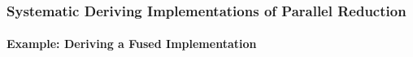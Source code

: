 \subsubsection{Systematic Deriving Implementations of Parallel Reduction}

\paragraph{Example: Deriving a Fused Implementation}

\newcommand{\Reduce}{\text{\textit{reduce}}\xspace}
\newcommand{\PartRed}{\text{\textit{part-red}}\xspace}
\newcommand{\RedSeq}{\text{\textit{reduce-seq}}\xspace}
\newcommand{\Map}{\text{\textit{map}}\xspace}
\newcommand{\MapSeq}{\text{\textit{map-seq}}\xspace}
\newcommand{\MyJoin}{\text{\textit{join}}\xspace}
\newcommand{\MySplit}[1]{\text{\textit{split}}^{#1}\xspace}

